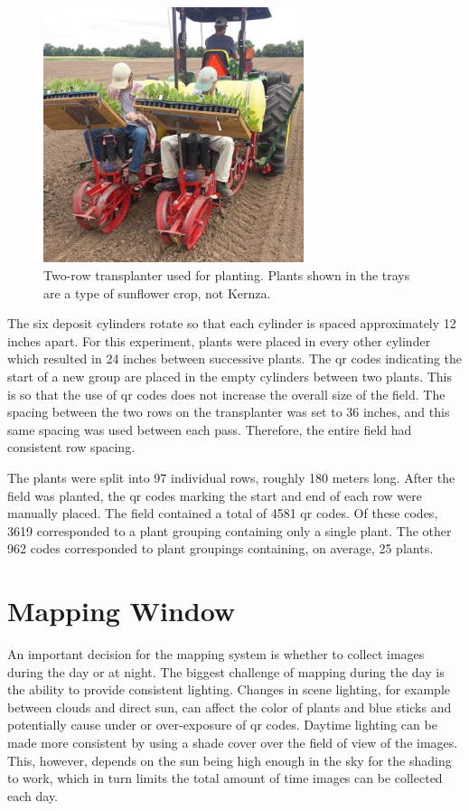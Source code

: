 \begin{figure}
	\centering
    \includegraphics[width=3in]{figures/transplanter.jpg}
    \caption[Transplanter]{Two-row transplanter used for planting. Plants shown in the trays are a type of sunflower crop, not Kernza.}
    \label{figure:transplanter}
\end{figure}  

The six deposit cylinders rotate so that each cylinder is spaced approximately 12 inches apart. For this experiment, plants were placed in every other cylinder which resulted in 24 inches between successive plants.  The \ac{qr} codes indicating the start of a new group are placed in the empty cylinders between two plants.  This is so that the use of \ac{qr} codes does not increase the overall size of the field. The spacing between the two rows on the transplanter was set to 36 inches, and this same spacing was used between each pass.  Therefore, the entire field had consistent row spacing. 

The plants were split into 97 individual rows, roughly 180 meters long.  After the field was planted, the \ac{qr} codes marking the start and end of each row were manually placed.  The field contained a total of 4581 \ac{qr} codes.  Of these codes, 3619 corresponded to a plant grouping containing only a single plant.  The other 962 codes corresponded to plant groupings containing, on average, 25 plants.  

\section{Mapping Window}

An important decision for the mapping system is whether to collect images during the day or at night.  The biggest challenge of mapping during the day is the ability to provide consistent lighting.  Changes in scene lighting, for example between clouds and direct sun, can affect the color of plants and blue sticks and potentially cause under or over-exposure of \ac{qr} codes.  Daytime lighting can be made more consistent by using a shade cover over the field of view of the images.  This, however, depends on the sun being high enough in the sky for the shading to work, which in turn limits the total amount of time images can be collected each day.  

